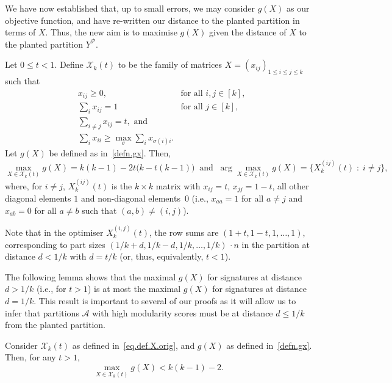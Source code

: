 \documentclass[a4paper,UKenglish,cleveref, autoref, thm-restate,numberwithinsect]{lipics-v2021}
\newcommand{\cA}{\mathcal{A}}
\newcommand{\cP}{\mathcal{P}}
\begin{document}
We have now established that, up to small errors, we may consider $g(X)$ as our objective function, and have re-written our distance to the planted partition in terms of $X$. Thus, the new aim is to maximise $g(X)$ given the distance of $X$ to the planted partition $Y^{\mathcal{P}}$. 




\begin{lemma}\label{lem:optimisation} Let $0\leq t <1$.
Define $\mathcal{X}_k(t)$ to be the family of matrices $X=(x_{ij})_{1\leq i \leq j \leq k}$ such that
\begin{align}
\nonumber &x_{ij} \geq 0, &\mbox{for all $i,j \in [k]$},\\[0.5em]
%
\label{eq.def.X.orig} &\sum_i x_{ij}  =  1 &\mbox{for all $j \in [k]$},  \\
%
\nonumber &\sum_{i\neq j}x_{ij}  = t, \mbox{ and }\\
\nonumber &\sum_{i}x_{ii} \geq \max_{\sigma} \sum_i x_{\sigma(i)i}.
\end{align}
%
%
Let $g(X)$ be defined as in~\eqref{defn.gx}. Then,
%
\[ \max_{X\in \mathcal{X}_k(t)} g(X) = k(k\!-\!1) - 2t \big( k\!-\!t(k\!-\!1)\big)\;\; \mbox{and} \;\; \arg\max_{X\in \mathcal{X}_k(t)} g(X) = \{ X_k^{(ij)}(t) \; : \; i\neq j \}, \] 
where, for $i\neq j$, $X^{(ij)}_k(t)$ is the $k\times k$ matrix with $x_{ij}=t$, $x_{jj}=1-t$, all other diagonal elements $1$ and non-diagonal elements~$0$ (i.e., $x_{aa}=1$ for all $a\neq j$ and $x_{ab}=0$ for all $a\neq b$ such that $(a,b)\neq (i,j)$).
\end{lemma}

Note that in the optimiser $X_k^{(i,j)}(t)$, the row sums are $(1+t, 1-t, 1, \ldots, 1)$, corresponding to part sizes $(1/k+d, 1/k-d, 1/k, \ldots, 1/k )\,\cdot n$ in the partition at distance $d<1/k$ with $d=t/k$ (or, thus, equivalently, $t<1$).

The following lemma shows that the maximal $g(X)$ for signatures at distance $d>1/k$ (i.e., for $t>1$) is at most the maximal $g(X)$ for signatures at distance $d=1/k$. This result is important to several of our proofs as it will allow us to infer that partitions $\cA$ with high modularity scores must be at distance $d\leq 1/k$ from the planted partition. 


\begin{lemma}\label{lem:opt_far_mod} 
Consider $\mathcal{X}_k(t)$ as defined in~\eqref{eq.def.X.orig}, and $g(X)$ as defined in~\eqref{defn.gx}.
Then, for any $t>1$,
\[ \max_{X\in \mathcal{X}_k(t)} g(X) < k(k-1)-2.\] 
\end{lemma}
\end{document}
